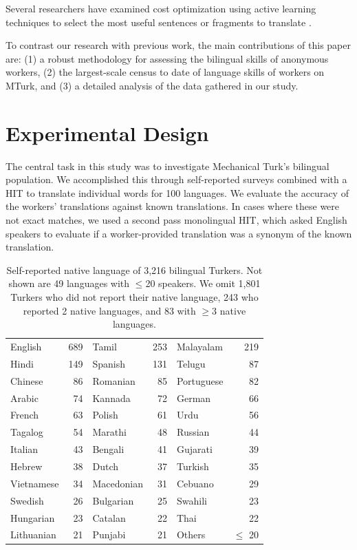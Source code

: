 \documentclass[11pt]{article}
\begin{document}
Several researchers have examined cost optimization using active learning techniques to select the most useful sentences or fragments to translate \cite{ambati_naacl,bloodgood-callisonburch:2010:ACL,AmbatiThesis}.

To contrast our research with previous work, the main contributions of this paper are: (1) a robust methodology for assessing the bilingual  skills of anonymous workers, (2) the largest-scale census to date of language skills of workers on MTurk, and (3) a detailed analysis of the data gathered in our study.

\section{Experimental Design}
The central task in this study was to investigate Mechanical Turk's bilingual population.  We accomplished this through self-reported surveys combined with a HIT to translate individual words for 100 languages.  We evaluate the accuracy of the workers' translations against known translations.  In cases where these were not exact matches, we used a second pass monolingual HIT, which asked English speakers to evaluate if a worker-provided translation was a synonym of the known translation.


\begin{table}
\footnotesize
\begin{tabular}{lrlrlr}\hline\hline
English & 689 & Tamil & 253 & Malayalam & 219 \\
Hindi & 149 & Spanish & 131 & Telugu & 87 \\
Chinese & 86 & Romanian & 85 & Portuguese & 82 \\
Arabic & 74 & Kannada & 72 & German & 66 \\
French & 63 & Polish & 61 & Urdu & 56 \\
Tagalog & 54 & Marathi & 48 & Russian & 44 \\
Italian & 43 & Bengali & 41 & Gujarati & 39 \\
Hebrew & 38 & Dutch & 37 & Turkish & 35 \\
Vietnamese & 34 & Macedonian & 31 & Cebuano & 29 \\
Swedish & 26 & Bulgarian & 25 & Swahili & 23 \\
Hungarian & 23 & Catalan & 22 & Thai & 22 \\
Lithuanian & 21 & Punjabi & 21 & Others & $\leq$ 20 \\
\hline\hline
\end{tabular}
\normalsize
\caption{Self-reported native language of 3,216 bilingual Turkers. Not shown are 49 languages with $\leq$20 speakers. 
We omit 1,801 Turkers who did not report their native language, 243 who reported 2 native languages, and 83 with $\geq$3 native languages.}\label{lang-pie}
\end{table}
\end{document}
